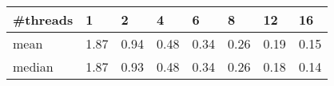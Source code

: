 
                \begin{tabu}{l|XXXXXXX}
                \#threads&1 &2 &4 &6 &8 &12 &16 \\
                \hline
                mean &1.87 &0.94 &0.48 &0.34 &0.26 &0.19 &0.15 \\
                median &1.87 &0.93 &0.48 &0.34 &0.26 &0.18 &0.14 \\
                \end{tabu}
            